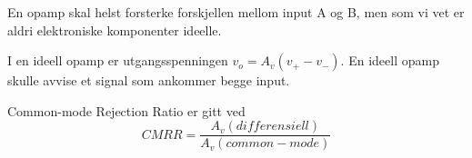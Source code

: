 En opamp skal helst forsterke forskjellen mellom input A og B, men som vi vet
er aldri elektroniske komponenter ideelle.

I en ideell opamp er utgangsspenningen $v_o = A_v(v_+ - v_-)$.
En ideell opamp skulle avvise et signal som ankommer begge input.

Common-mode Rejection Ratio er gitt ved
$$CMRR = \frac{A_v (differensiell)}{A_v (common-mode)}$$
